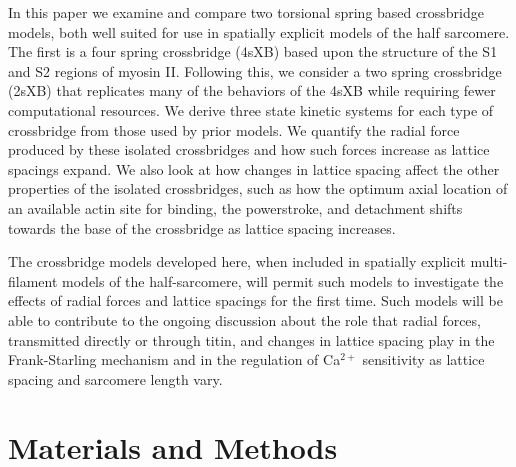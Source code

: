 \documentclass[]{article}
\begin{document}
In this paper we examine and compare two torsional spring based crossbridge models, both well suited for use in spatially explicit models of the half sarcomere. 
The first is a four spring crossbridge (4sXB) based upon the structure of the S1 and S2 regions of myosin II. 
Following this, we consider a two spring crossbridge (2sXB) that replicates many of the behaviors of the 4sXB while requiring fewer computational resources. 
We derive three state kinetic systems for each type of crossbridge from those used by prior models. 
We quantify the radial force produced by these isolated crossbridges and how such forces increase as lattice spacings expand.
We also look at how changes in lattice spacing affect the other properties of the isolated crossbridges, such as how the optimum axial location of an available actin site for binding, the powerstroke, and detachment shifts towards the base of the crossbridge as lattice spacing increases. 

The crossbridge models developed here, when included in spatially explicit multi-filament models of the half-sarcomere, will permit such models to investigate the effects of radial forces and lattice spacings for the first time. 
Such models will be able to contribute to the ongoing discussion about the role that radial forces, transmitted directly or through titin, and changes in lattice spacing play in the Frank-Starling mechanism and in the regulation of Ca$^{2+}$ sensitivity as lattice spacing and sarcomere length vary. %




\section{Materials and Methods}  %
\end{document}
